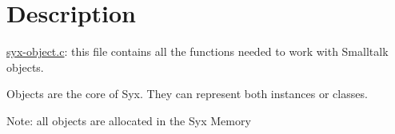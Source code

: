 \hypertarget{syx_object_Description}{}\section{Description}\label{syx_object_Description}
\hyperlink{syx-object_8c}{syx-object.c}: this file contains all the functions needed to work with Smalltalk objects.

Objects are the core of Syx. They can represent both instances or classes. \begin{Desc}
\item[Note:]all objects are allocated in the Syx Memory \end{Desc}
